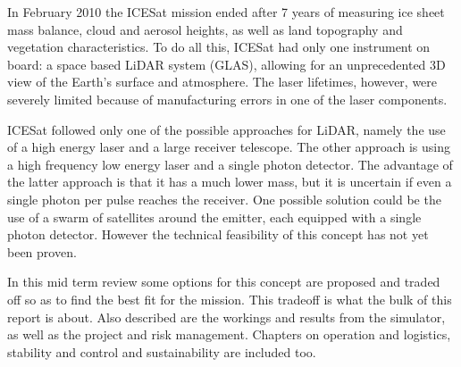 In February 2010 the ICESat mission ended after 7 years of measuring ice sheet mass balance, cloud and aerosol heights, as well as land topography and vegetation characteristics.
To do all this, ICESat had only one instrument on board: a space based \ac{LiDAR} system (\ac{GLAS}), allowing for an unprecedented 3D view of the Earth's surface and atmosphere.
The laser lifetimes, however, were severely limited because of manufacturing errors in one of the laser components.

ICESat followed only one of the possible approaches for \ac{LiDAR}, namely the use of a high energy laser and a large receiver telescope. The other approach is using a high frequency low energy laser and a single photon detector. The advantage of the latter approach is that it has a much lower mass, but it is uncertain if even a single photon per pulse reaches the receiver. One possible solution could be the use of a swarm of satellites around the emitter, each equipped with a single photon detector. However the technical feasibility of this concept has not yet been proven.

In this mid term review some options for this concept are proposed and traded off so as to find the best fit for the mission. This tradeoff is what the bulk of this report is about. Also described are the workings and results from the simulator, as well as the project and risk management. Chapters on operation and logistics, stability and control and sustainability are included too.

